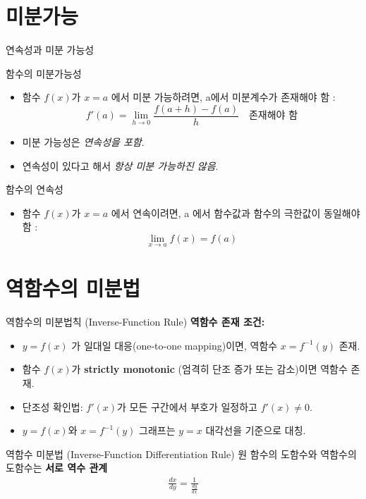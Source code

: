 \documentclass[aspectratio=169]{beamer}
\begin{document}
\section{미분가능}

\begin{frame}{연속성과 미분 가능성}
  \begin{block}{함수의 미분가능성}
    \begin{itemize}
      \item 함수 \( f(x) \)가 \( x = a \) 에서 미분 가능하려면, a에서 미분계수가 존재해야 함 :
      \[f'(a) = \lim_{h \to 0} \frac{f(a+h)-f(a)}{h} \quad \text{존재해야 함}\]
      \item 미분 가능성은 \textit{연속성을 포함}.
      \item 연속성이 있다고 해서 \textit{항상 미분 가능하진 않음}.
    \end{itemize}
  \end{block}
  \begin{block}{함수의 연속성}
    \begin{itemize}
      \item 함수 \( f(x) \)가 \( x = a \) 에서 연속이려면, a 에서 함수값과 함수의 극한값이 동일해야 함 :
      \[\lim_{x \to a} f(x) = f(a)\]
    \end{itemize}
  \end{block}
\end{frame}





\section{역함수의 미분법}

\begin{frame}{역함수의 미분법칙 (Inverse-Function Rule)}
    \textbf{역함수 존재 조건:}
    \begin{itemize}
      \item \( y = f(x) \) 가 일대일 대응(one-to-one mapping)이면, 역함수 \( x = f^{-1}(y) \) 존재.
      \item 함수 \( f(x) \)가 \textbf{strictly monotonic} (엄격히 단조 증가 또는 감소)이면 역함수 존재.
      \item 단조성 확인법: \( f'(x) \)가 모든 구간에서 부호가 일정하고 \( f'(x) \neq 0 \).
      \item \( y = f(x) \)와 \( x = f^{-1}(y) \) 그래프는 \( y=x \) 대각선을 기준으로 대칭.
    \end{itemize}
  \begin{block}{역함수 미분법 (Inverse-Function Differentiation Rule)}
    원 함수의 도함수와 역함수의 도함수는 \textbf{서로 역수 관계}
    \begin{align*}
      \frac{dx}{dy} = \frac{1}{\frac{dy}{dx}}
    \end{align*}
  \end{block}
\end{frame}
\end{document}
